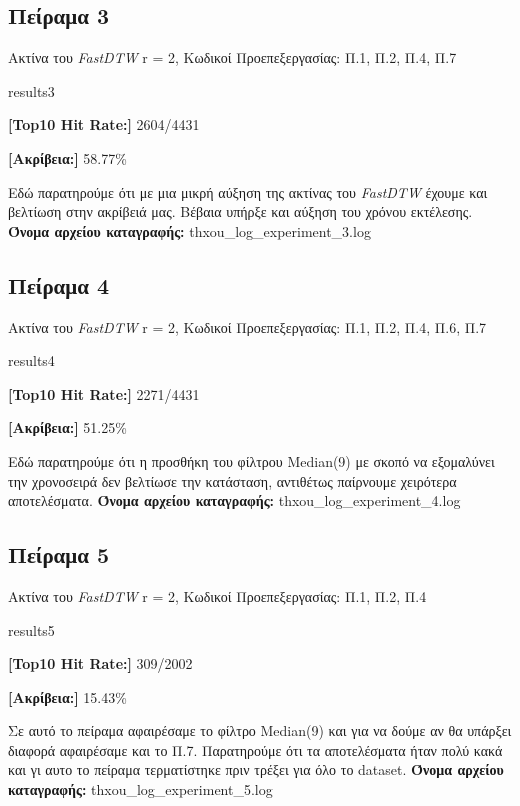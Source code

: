 \subsection{Πείραμα 3}
Ακτίνα του \textit{FastDTW} r = 2, Κωδικοί Προεπεξεργασίας: Π.1, Π.2, Π.4, Π.7
\begin{labeling}{results3}
	\item \textbf{[Top10 Hit Rate:]} 2604/4431
	\item \textbf{[Ακρίβεια:]} 58.77\%
\end{labeling}
Εδώ παρατηρούμε ότι με μια μικρή αύξηση της ακτίνας του \textit{FastDTW} έχουμε και βελτίωση στην ακρίβειά μας.
Βέβαια υπήρξε και αύξηση του χρόνου εκτέλεσης.
\textbf{Όνομα αρχείου καταγραφής:} thxou\_log\_experiment\_3.log

\subsection{Πείραμα 4}
Ακτίνα του \textit{FastDTW} r = 2, Κωδικοί Προεπεξεργασίας: Π.1, Π.2, Π.4, Π.6, Π.7
\begin{labeling}{results4}
	\item \textbf{[Top10 Hit Rate:]} 2271/4431
	\item \textbf{[Ακρίβεια:]} 51.25\%
\end{labeling}
Εδώ παρατηρούμε ότι η προσθήκη του φίλτρου Median(9) με σκοπό να εξομαλύνει την χρονοσειρά δεν βελτίωσε την κατάσταση, αντιθέτως παίρνουμε χειρότερα αποτελέσματα.
\textbf{Όνομα αρχείου καταγραφής:} thxou\_log\_experiment\_4.log

\subsection{Πείραμα 5}
Ακτίνα του \textit{FastDTW} r = 2, Κωδικοί Προεπεξεργασίας: Π.1, Π.2, Π.4
\begin{labeling}{results5}
	\item \textbf{[Top10 Hit Rate:]} 309/2002
	\item \textbf{[Ακρίβεια:]} 15.43\%
\end{labeling}
Σε αυτό το πείραμα αφαιρέσαμε το φίλτρο Median(9) και για να δούμε αν θα υπάρξει διαφορά αφαιρέσαμε και το Π.7. Παρατηρούμε ότι τα αποτελέσματα ήταν πολύ κακά και γι αυτο το πείραμα τερματίστηκε πριν τρέξει για όλο το dataset.
\textbf{Όνομα αρχείου καταγραφής:} thxou\_log\_experiment\_5.log

